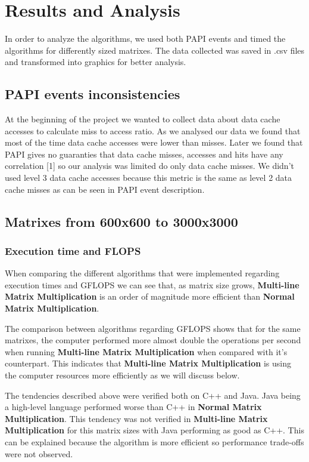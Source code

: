 \section{Results and Analysis}

In order to analyze the algorithms, we used both PAPI events and timed the algorithms for differently sized matrixes.
The data collected was saved in .csv files and transformed into graphics for better analysis.

\subsection{PAPI events inconsistencies}

At the beginning of the project we wanted to collect data about data cache accesses to calculate miss to access ratio.
As we analysed our data we found that most of the time data cache accesses were lower than misses. Later we found that PAPI gives no guaranties that data cache misses, accesses and hits have any correlation [1] so our analysis was limited do only data cache misses. We didn't used level 3 data cache accesses because this metric is the same as level 2 data cache misses as can be seen in PAPI event description. 

\subsection{Matrixes from 600x600 to 3000x3000}

\subsubsection{Execution time and \uppercase{FLOPS}}

When comparing the different algorithms that were implemented regarding execution times and \uppercase{GFLOPS} we can see that, as matrix size grows, \textbf{Multi-line Matrix Multiplication} is an order of magnitude more efficient than \textbf{Normal Matrix Multiplication}. 

The comparison between algorithms regarding GFLOPS shows that for the same matrixes, the computer performed more almost double the operations per second when running \textbf{Multi-line Matrix Multiplication} when compared with it's counterpart. This indicates that \textbf{Multi-line Matrix Multiplication} is using the computer resources more efficiently as we will discuss below.

The tendencies described above were verified both on C++ and Java. Java being a high-level language performed worse than C++ in \textbf{Normal Matrix Multiplication}. This tendency was not verified in \textbf{Multi-line Matrix Multiplication} for this matrix sizes with Java performing as good as C++. This can be explained because the algorithm is more efficient so performance trade-offs were not observed.

